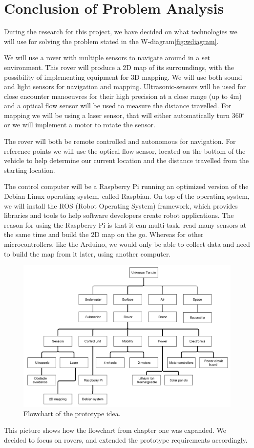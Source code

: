 \section{Conclusion of Problem Analysis}

During the research for this project, we have decided on what technologies we will use for solving the problem stated in the W-diagram\ref{fig:wdiagram}.

We will use a rover with multiple sensors to navigate around in a set environment. This rover will produce a 2D map of its surroundings, with the possibility of implementing equipment for 3D mapping. We will use both sound and light sensors for navigation and mapping. Ultrasonic-sensors will be used for close encounter manoeuvres for their high precision at a close range (up to 4m)\cite{ultra} and a optical flow sensor will be used to measure the distance travelled. For mapping we will be using a laser sensor, that will either automatically turn 360$^{\circ}$ or we will implement a motor to rotate the sensor.

The rover will both be remote controlled and autonomous for navigation. For reference points we will use the optical flow sensor, located on the bottom of the vehicle to help determine our current location and the distance travelled from the starting location.

The control computer will be a Raspberry Pi running an optimized version of the Debian Linux operating system, called Raspbian. On top of the operating system, we will install the ROS (Robot Operating System) framework, which provides libraries and tools to help software developers create robot applications\cite{ros}. %
The reason for using the Raspberry Pi is that it can multi-task, read many sensors at the same time and build the 2D map on the go. Whereas for other microcontrollers, like the Arduino, we would only be able to collect data and need to build the map from it later, using another computer.

\begin{figure}[H]
	\centering
	\includegraphics[scale=.1]{images/level3.png}
	\caption{Flowchart of the prototype idea.}
	\label{fig:level3}
\end{figure}

This picture shows how the flowchart from chapter one was expanded. We decided to focus on rovers, and extended the prototype requirements accordingly.

\clearpage
